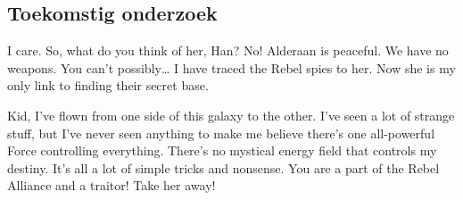 \documentclass[a0,portrait]{hogent-poster}
\begin{document}
\begin{multicols}{2}
\section{Toekomstig onderzoek}

I care. So, what do you think of her, Han? No! Alderaan is peaceful. We have no weapons. You can't possibly… I have traced the Rebel spies to her. Now she is my only link to finding their secret base.

Kid, I've flown from one side of this galaxy to the other. I've seen a lot of strange stuff, but I've never seen anything to make me believe there's one all-powerful Force controlling everything. There's no mystical energy field that controls my destiny. It's all a lot of simple tricks and nonsense. You are a part of the Rebel Alliance and a traitor! Take her away! 

\end{multicols}
\end{document}
